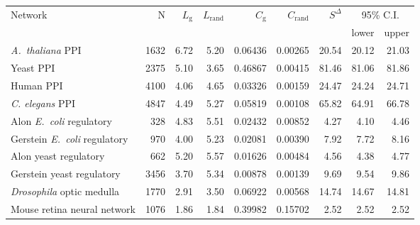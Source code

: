 \begin{tabular}{lrrrrrrrr}
\hline
Network & N  & $L_{\mathrm{g}}$ & $L_{\mathrm{rand}}$ & $C_{\mathrm{g}}$ & $C_{\mathrm{rand}}$ &  $S^{\Delta}$ & \multicolumn{2}{c}{95\% C.I.}\\
        &    &                   &                      &                   &                      &             &  lower   & upper \\
\hline
\textit{A.~thaliana} PPI & 1632 & 6.72 & 5.20 & 0.06436 & 0.00265 & 20.54 & 20.12 & 21.03\\
Yeast PPI & 2375 & 5.10 & 3.65 & 0.46867 & 0.00415 & 81.46 & 81.06 & 81.86\\
Human PPI & 4100 & 4.06 & 4.65 & 0.03326 & 0.00159 & 24.47 & 24.24 & 24.71\\
\textit{C. elegans} PPI & 4847 & 4.49 & 5.27 & 0.05819 & 0.00108 & 65.82 & 64.91 & 66.78\\
Alon \textit{E.~coli} regulatory & 328 & 4.83 & 5.51 & 0.02432 & 0.00852 & 4.27 & 4.10 & 4.46\\
Gerstein \textit{E.~coli} regulatory & 970 & 4.00 & 5.23 & 0.02081 & 0.00390 & 7.92 & 7.72 & 8.16\\
Alon yeast regulatory & 662 & 5.20 & 5.57 & 0.01626 & 0.00484 & 4.56 & 4.38 & 4.77\\
Gerstein yeast regulatory & 3456 & 3.70 & 5.34 & 0.00878 & 0.00139 & 9.69 & 9.54 & 9.86\\
\textit{Drosophila} optic medulla & 1770 & 2.91 & 3.50 & 0.06922 & 0.00568 & 14.74 & 14.67 & 14.81\\
Mouse retina neural network & 1076 & 1.86 & 1.84 & 0.39982 & 0.15702 & 2.52 & 2.52 & 2.52\\
\hline
\end{tabular}
